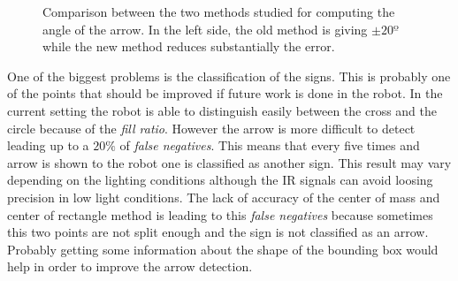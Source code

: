 \begin{figure}[h]
\centering
{}
\caption{Comparison between the two methods studied for computing the angle of the arrow. In the left side,  the old method is giving $\pm 20º$ while the new method reduces substantially the error.}
\label{fig:angle}
\end{figure}

One of the biggest problems is the classification of the signs. This is probably one of the points that should be improved if future work is done in the robot. In the current setting the robot is able to distinguish easily between the cross and the circle because of the \textit{fill ratio}. However the arrow is more difficult to detect leading up to a $20\%$ of \textit{false negatives}. This means that every five times and arrow is shown to the robot one is classified as another sign. This result may vary depending on the lighting conditions although the IR signals can avoid loosing precision in low light conditions. The lack of accuracy of the center of mass and center of rectangle method is leading to this \textit{false negatives} because sometimes this two points are not split enough and the sign is not classified as an arrow. Probably getting some information about the shape of the bounding box would help in order to improve the arrow detection.

